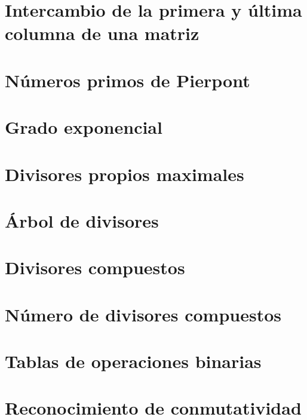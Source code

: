 \documentclass[a4paper,12pt,twoside]{book}
\begin{document}
\chapter{Intercambio de la primera y última columna de
  una matriz}
\label{171218}

\chapter{Números primos de Pierpont}
\label{181218}

\chapter{Grado exponencial}
\label{191218}

\chapter{Divisores propios maximales}
\label{201218}

\chapter{Árbol de divisores}
\label{211218}


\chapter{Divisores compuestos}
\label{181224}

\chapter{Número de divisores compuestos}
\label{181225}

\chapter{Tablas de operaciones binarias}
\label{181226}

\chapter{Reconocimiento de conmutatividad}
\label{181227}
\end{document}
